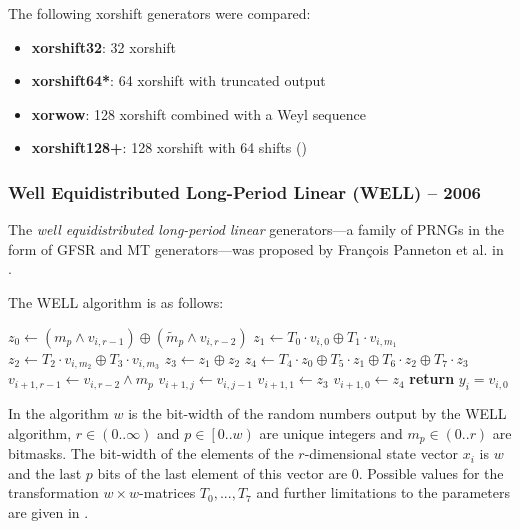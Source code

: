     The following xorshift generators were compared:
    \begin{itemize}
        \itemsep0em
        \item \textbf{xorshift32}: \SI{32}{\bit} xorshift
        \item \textbf{xorshift64*}: \SI{64}{\bit} xorshift with truncated output
        \item \textbf{xorwow}: \SI{128}{\bit} xorshift combined with a Weyl sequence
        \item \textbf{xorshift128+}: \SI{128}{\bit} xorshift with \SI{64}{\bit} shifts (\cite{Vigna:2017})
    \end{itemize}

\subsubsection[Well Equidistributed Long-Period Linear (WELL) -- 2006]{Well Equidistributed Long-Period Linear (WELL) -- 2006} \label{subsubsec:well}

    The \emph{well equidistributed long-period linear} generators---a family of PRNGs in the form of GFSR and MT generators---was proposed by François Panneton et al. in \cite{Panneton:2006}.

    The WELL algorithm is as follows:
    \begin{algorithmic}[]
        \State $z_0 \leftarrow \left(m_p \land v_{i, r - 1}\right) \oplus \left(\widetilde{m}_p \land v_{i, r - 2}\right)$
        \State $z_1 \leftarrow T_0 \cdot v_{i, 0} \oplus T_1 \cdot v_{i, m_1}$
        \State $z_2 \leftarrow T_2 \cdot v_{i, m_2} \oplus T_3 \cdot v_{i, m_3}$
        \State $z_3 \leftarrow z_1 \oplus z_2$
        \State $z_4 \leftarrow T_4 \cdot z_0 \oplus T_5 \cdot z_1 \oplus T_6 \cdot z_2 \oplus T_7 \cdot z_3$
        \State $v_{i + 1, r - 1} \leftarrow v_{i, r - 2} \land m_p$
            \State $v_{i + 1, j} \leftarrow v_{i, j - 1}$
        \EndFor
        \State $v_{i + 1, 1} \leftarrow z_3$
        \State $v_{i + 1, 0} \leftarrow z_4$
        \State \textbf{return} $y_i = v_{i, 0}$
    \end{algorithmic}
    In the algorithm $w$ is the bit-width of the random numbers output by the WELL algorithm, $r \in \left(0.. \infty\right)$ and $p \in \left[0.. w\right)$ are unique integers and $m_p \in \left(0.. r\right)$ are bitmasks. The bit-width of the elements of the $r$-dimensional state vector $x_i$ is $w$ and the last $p$ bits of the last element of this vector are $0$. Possible values for the transformation $w{\times}w$-matrices $T_0, ..., T_7$ and further limitations to the parameters are given in \cite{Panneton:2006}.

